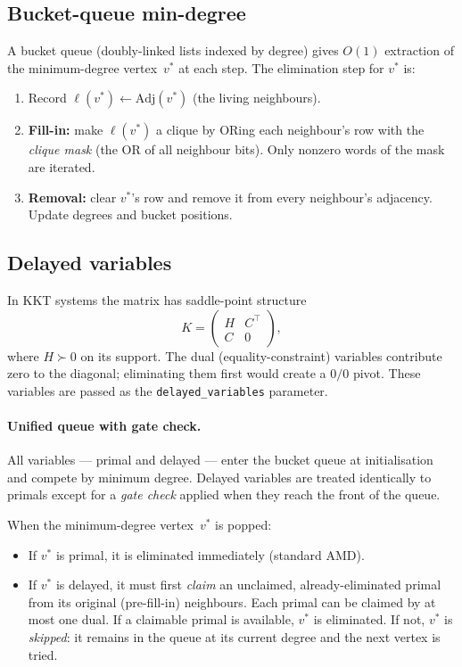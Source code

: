 \documentclass[11pt]{article}
\begin{document}
\subsection{Bucket-queue min-degree}

A bucket queue (doubly-linked lists indexed by degree) gives $O(1)$
extraction of the minimum-degree vertex~$v^*$ at each step.  The
elimination step for $v^*$ is:

\begin{enumerate}
  \item Record $\ell(v^*) \gets \mathrm{Adj}(v^*)$ (the living
    neighbours).
  \item \textbf{Fill-in:} make $\ell(v^*)$ a clique by ORing
    each neighbour's row with the \emph{clique mask} (the OR of all
    neighbour bits).  Only nonzero words of the mask are iterated.
  \item \textbf{Removal:} clear $v^*$'s row and remove it from every
    neighbour's adjacency.  Update degrees and bucket positions.
\end{enumerate}

\subsection{Delayed variables}\label{sec:delayed}

In KKT systems the matrix has saddle-point structure
\[
  K = \begin{pmatrix} H & C^\top \\ C & 0 \end{pmatrix},
\]
where $H\succ 0$ on its support.  The dual (equality-constraint) variables
contribute zero to the diagonal; eliminating them first would create a
$0/0$ pivot.  These variables are passed as the
\texttt{delayed\_variables} parameter.

\paragraph{Unified queue with gate check.}
All variables --- primal and delayed --- enter the bucket queue at
initialisation and compete by minimum degree.  Delayed variables are
treated identically to primals except for a \emph{gate check} applied
when they reach the front of the queue.

When the minimum-degree vertex~$v^*$ is popped:
\begin{itemize}
  \item If $v^*$ is primal, it is eliminated immediately (standard AMD).
  \item If $v^*$ is delayed, it must first \emph{claim} an unclaimed,
    already-eliminated primal from its original (pre-fill-in) neighbours.
    Each primal can be claimed by at most one dual.  If a claimable primal
    is available, $v^*$ is eliminated.  If not, $v^*$ is \emph{skipped}:
    it remains in the queue at its current degree and the next vertex is
    tried.
\end{itemize}
\end{document}
